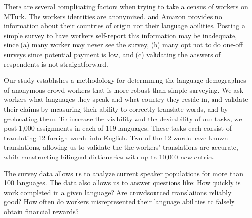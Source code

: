 \documentclass[11pt]{article}
\begin{document}

There are several complicating factors when trying to take a census of workers on MTurk.  The workers identities are anonymized, and Amazon provides no information about their countries of origin nor their language abilities.  Posting a simple survey to have workers self-report this information may be inadequate, since (a) many worker may never see the survey, (b) many opt not to do one-off surveys since potential payment is low, and (c) validating the answers of respondents is not straightforward. 

Our study establishes a methodology for determining the language demographics of anonymous crowd workers that is more robust than simple surveying. We ask workers what languages they speak and what country they reside in, and validate their claims by measuring their ability to correctly translate words, and by geolocating them.  To increase the visibility and the desirability of our tasks, we post 1,000 assignments in each of 119 languages.  These tasks each consist of translating 12 foreign words into English.  Two of the 12 words have known translations, allowing us to validate the the workers' translations are accurate, while constructing bilingual dictionaries with up to 10,000 new entries. 


The survey data allows us to analyze current speaker populations for more than 100 languages.  The data also allows us to answer questions like: 
How quickly is work completed in a given language? 
Are crowdsourced translations reliably good? 
How often do workers misrepresented their language abilities to falsely obtain financial rewards? 
\end{document}

